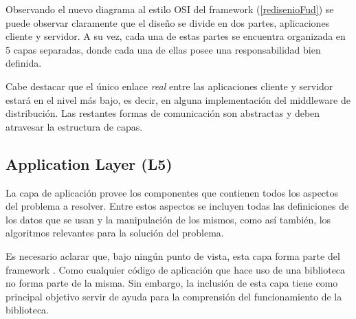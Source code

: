 		Observando el nuevo diagrama al estilo OSI del framework \fud (\ref{redisenioFud}) se puede observar claramente que el dise\~no se divide en dos partes, 
		aplicaciones cliente y servidor. A su vez, cada una de estas partes se encuentra organizada en 5 capas separadas, donde cada una de ellas posee una 
		responsabilidad bien definida.
		
		Cabe destacar que el \'unico enlace \textit{real} entre las aplicaciones cliente y servidor estar\'a en el nivel m\'as bajo, es decir, en alguna 
		implementaci\'on del middleware de distribuci\'on. Las restantes formas de comunicaci\'on son abstractas y deben atravesar la estructura de capas.

    \subsection{Application Layer (L5)}\label{applicationLayer5}
			La capa de aplicaci\'on provee los componentes que contienen todos los aspectos del problema a resolver. Entre estos aspectos se incluyen 
			todas las definiciones de los datos que se usan y la manipulaci\'on de los mismos, como as\'i tambi\'en, los algoritmos relevantes para la 
			soluci\'on del problema.

			Es necesario aclarar que, bajo ning\'un punto de vista, esta capa forma parte del framework \fud. Como cualquier c\'odigo de aplicaci\'on que hace
			uso de una biblioteca no forma parte de la misma. Sin embargo, la inclusi\'on de esta capa tiene como principal objetivo servir de ayuda para la 
			comprensi\'on del funcionamiento de la biblioteca.
			
